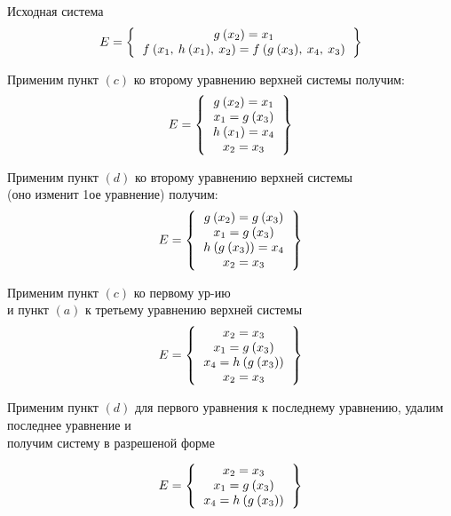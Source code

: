     \begin{example}\end{example}
			Исходная система
		\[
		E=
			\left \{
			\begin{tabular}{c}
				$g\:(x_2)=x_1$\\
				$f\:(x_1,\: h\: (x_1),\: x_2)=f\:(g\:(x_3),\: x_4,\: x_3)$
			\end{tabular}
			\right \}
		\]

			Применим пункт $(c)$ ко второму уравнению верхней системы получим:
			\[
		E=
			\left \{
			\begin{tabular}{c}
				$g\:(x_2)=x_1$\\
				$x_1=g\:(x_3)$\\
				$h\:(x_1)=x_4$\\
				$x_2=x_3$
			\end{tabular}
			\right \}
		\]

			Применим пункт $(d)$ ко второму уравнению верхней системы\\
				(оно изменит 1ое уравнение) получим:
			\[
			E=
			\left \{
			\begin{tabular}{c}
				$g\:(x_2)=g\:(x_3)$\\
				$x_1=g\:(x_3)$\\
				$h\:(g\:(x_3))=x_4$\\
				$x_2=x_3$

			\end{tabular}
			\right \}
		\]

			Применим пункт $(c)$ ко первому ур-ию\\
				и пункт $(a)$ к третьему уравнению верхней системы
			\[
			E=
			\left \{
			\begin{tabular}{c}
				$x_2=x_3$\\
				$x_1=g\:(x_3)$\\
				$x_4=h\:(g\:(x_3))$\\
				$x_2=x_3$
			\end{tabular}
			\right \}
		\]

			Применим пункт $(d)$ для первого уравнения к последнему уравнению, удалим последнее уравнение и \\
			получим систему в разрешеной форме

\[
			E=
			\left \{
			\begin{tabular}{c}
				$x_2=x_3$\\
				$x_1=g\:(x_3)$\\
				$x_4=h\:(g\:(x_3))$
			\end{tabular}
			\right \}
		\]

